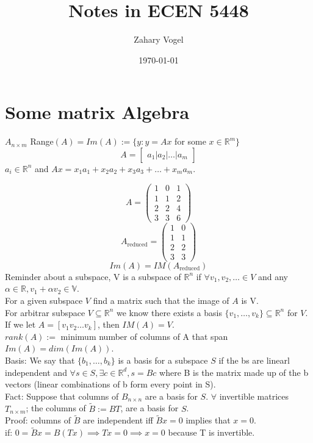 \documentclass{article}
\author{Zahary Vogel}
\date{\today}
\title{Notes in ECEN 5448}
\begin{document}
\maketitle


\section{Some matrix Algebra}
$A_{n\times m}$
Range$(A)=Im(A):=\{y:y=Ax$ for some $x\in\mathbb{R}^m\}$
\[A=\begin{bmatrix}a_1\bigg|a_2\bigg|\dots\bigg|a_m\end{bmatrix}\]
$a_i\in\mathbb{R}^n$ and $Ax=x_1a_1+x_2a_2+x_3a_3+\dots+x_ma_m$.

\[A=\begin{pmatrix}1&0&1\\1&1&2\\2&2&4\\3&3&6\end{pmatrix}\]
\[A_{\text{reduced}}=\begin{pmatrix}1 &0\\1&1\\2&2\\3&3\end{pmatrix}\]
\[Im(A)=IM(A_{\text{reduced}})\]
Reminder about a subspace, V is a subspace of $\mathbb{R}^n$ if $\forall v_1,v_2,\dots\in V$ and any $\alpha\in\mathbb{R}, v_1+\alpha v_2\in\mathbb{V}$.\\
For a given subspace $V$ find a matrix such that the image of $A$ is V.\\
For arbitrar subspace $V\subseteq \mathbb{R}^n$ we know there exists a basis $\{v_1,\dots ,v_k\}\subseteq\mathbb{R}^n$ for $V$. If we let $A=[v_1v_2\dots v_k]$, then $IM(A)=V$.\\
$rank(A):=$ minimum number of columns of A that span$Im(A)=dim(Im(A))$.\\

Basis: We say that $\{b_1,\dots,b_k\}$ is a basis for a subspace $S$ if the bs are linearl independent and $\forall s\in S, \exists c\in\mathbb{R}^d, s=Bc$ where B is the matrix made up of the b vectors (linear combinations of b form every point in S).\\

Fact: Suppose that columns of $B_{n\times n}$ are a basis for $S$. $\forall$ invertible matrices $T_{n\times m}$; the columns of $\tilde{B}:=BT$, are a basis for $S$.\\
Proof: columns of $\tilde{B}$ are independent iff $\tilde{B}x=0$ implies that $x=0$.\\
if: $0=\tilde{B}x=B(Tx)\implies Tx=0\implies x=0$ because T is invertible.\\
\end{document}
